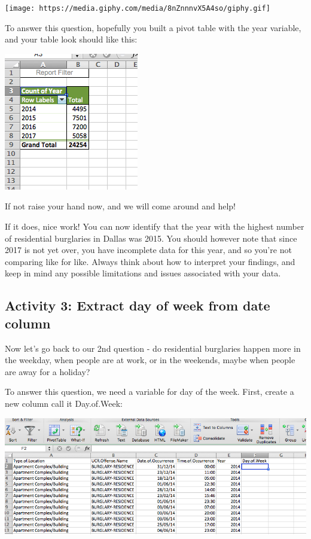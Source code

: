 \documentclass[]{book}
\theoremstyle{definition}
\theoremstyle{definition}
\theoremstyle{definition}
\theoremstyle{remark}
\begin{document}
\texttt{[image: https://media.giphy.com/media/8nZnnnvX5A4so/giphy.gif]}

To answer this question, hopefully you built a pivot table with the year
variable, and your table look should like this:

\includegraphics{imgs/count_of_yr.png}

If not raise your hand now, and we will come around and help!

If it does, nice work! You can now identify that the year with the
highest number of residential burglaries in Dallas was 2015. You should
however note that since 2017 is not yet over, you have incomplete data
for this year, and so you're not comparing like for like. Always think
about how to interpret your findings, and keep in mind any possible
limitations and issues associated with your data.

\hypertarget{activity-3-extract-day-of-week-from-date-column}{%
\subsection{Activity 3: Extract day of week from date
column}\label{activity-3-extract-day-of-week-from-date-column}}

Now let's go back to our 2nd question - do residential burglaries happen
more in the weekday, when people are at work, or in the weekends, maybe
when people are away for a holiday?

 To answer this question, we need a variable for day of the week. First,
create a new column call it Day.of.Week:

\includegraphics{imgs/create_day_of_wk_col.png}
\end{document}
